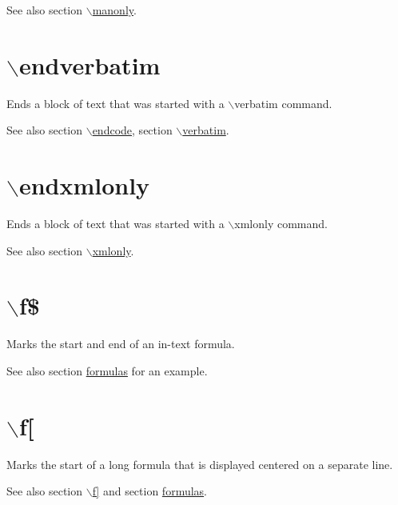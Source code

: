 \begin{DoxySeeAlso}{See also}
section \hyperlink{commands_cmdmanonly}{$\backslash$manonly}.
\end{DoxySeeAlso}


 \hypertarget{commands_cmdendverbatim}{}\section{$\backslash$endverbatim}\label{commands_cmdendverbatim}
 Ends a block of text that was started with a $\backslash$verbatim command.

\begin{DoxySeeAlso}{See also}
section \hyperlink{commands_cmdendcode}{$\backslash$endcode}, section \hyperlink{commands_cmdverbatim}{$\backslash$verbatim}.
\end{DoxySeeAlso}


 \hypertarget{commands_cmdendxmlonly}{}\section{$\backslash$endxmlonly}\label{commands_cmdendxmlonly}
 Ends a block of text that was started with a $\backslash$xmlonly command.

\begin{DoxySeeAlso}{See also}
section \hyperlink{commands_cmdxmlonly}{$\backslash$xmlonly}.
\end{DoxySeeAlso}


 \hypertarget{commands_cmdfdollar}{}\section{$\backslash$f\$}\label{commands_cmdfdollar}

Marks the start and end of an in-\/text formula. \begin{DoxySeeAlso}{See also}
section \hyperlink{formulas}{formulas} for an example.
\end{DoxySeeAlso}


 \hypertarget{commands_cmdfbropen}{}\section{$\backslash$f\mbox{[}}\label{commands_cmdfbropen}
\index{\f[@{$\backslash$f[}}

Marks the start of a long formula that is displayed centered on a separate line. \begin{DoxySeeAlso}{See also}
section \hyperlink{commands_cmdfbrclose}{$\backslash$f\mbox{]}} and section \hyperlink{formulas}{formulas}.
\end{DoxySeeAlso}



